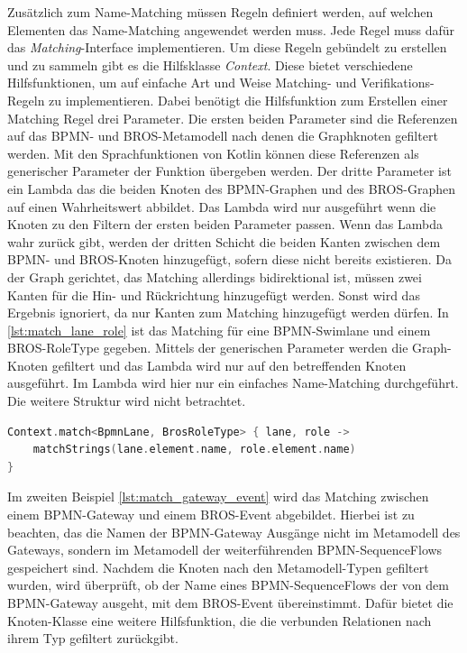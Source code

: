 Zusätzlich zum Name-Matching müssen Regeln definiert werden, auf welchen Elementen das Name-Matching angewendet werden muss.
Jede Regel muss dafür das \emph{Matching}-Interface implementieren.
Um diese Regeln gebündelt zu erstellen und zu sammeln gibt es die Hilfsklasse \emph{Context}.
Diese bietet verschiedene Hilfsfunktionen, um auf einfache Art und Weise Matching- und Verifikations-Regeln zu implementieren.
Dabei benötigt die Hilfsfunktion zum Erstellen einer Matching Regel drei Parameter.
Die ersten beiden Parameter sind die Referenzen auf das BPMN- und BROS-Metamodell nach denen die Graphknoten gefiltert werden.
Mit den Sprachfunktionen von Kotlin können diese Referenzen als generischer Parameter der Funktion übergeben werden.
Der dritte Parameter ist ein Lambda das die beiden Knoten des BPMN-Graphen und des BROS-Graphen auf einen Wahrheitswert abbildet.
Das Lambda wird nur ausgeführt wenn die Knoten zu den Filtern der ersten beiden Parameter passen.
Wenn das Lambda wahr zurück gibt, werden der dritten Schicht die beiden Kanten zwischen dem BPMN- und BROS-Knoten hinzugefügt, sofern diese nicht bereits existieren.
Da der Graph gerichtet, das Matching allerdings bidirektional ist, müssen zwei Kanten für die Hin- und Rückrichtung hinzugefügt werden.
Sonst wird das Ergebnis ignoriert, da nur Kanten zum Matching hinzugefügt werden dürfen.
In \cref{lst:match_lane_role} ist das Matching für eine BPMN-Swimlane und einem BROS-RoleType gegeben.
Mittels der generischen Parameter werden die Graph-Knoten gefiltert und das Lambda wird nur auf den betreffenden Knoten ausgeführt. 
Im Lambda wird hier nur ein einfaches Name-Matching durchgeführt.
Die weitere Struktur wird nicht betrachtet.

\begin{lstlisting}[language=Kotlin, caption=Matching Regel von einer BPMN-SwimLane und einem BROS-RoleType, label=lst:match_lane_role]
Context.match<BpmnLane, BrosRoleType> { lane, role ->
    matchStrings(lane.element.name, role.element.name)
}
\end{lstlisting}

Im zweiten Beispiel \cref{lst:match_gateway_event} wird das Matching zwischen einem BPMN-Gateway und einem BROS-Event abgebildet.
Hierbei ist zu beachten, das die Namen der BPMN-Gateway Ausgänge nicht im Metamodell des Gateways, sondern im Metamodell der weiterführenden BPMN-SequenceFlows gespeichert sind.
Nachdem die Knoten nach den Metamodell-Typen gefiltert wurden, wird überprüft, ob der Name eines BPMN-SequenceFlows der von dem BPMN-Gateway ausgeht, mit dem BROS-Event übereinstimmt.
Dafür bietet die Knoten-Klasse eine weitere Hilfsfunktion, die die verbunden Relationen nach ihrem Typ gefiltert zurückgibt.

